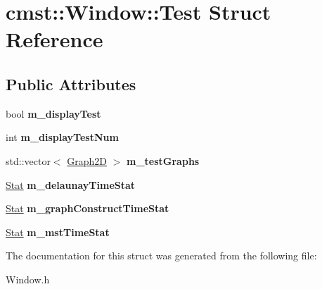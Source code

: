 \hypertarget{structcmst_1_1_window_1_1_test}{}\section{cmst\+:\+:Window\+:\+:Test Struct Reference}
\label{structcmst_1_1_window_1_1_test}
\subsection*{Public Attributes}
\begin{DoxyCompactItemize}
\item 
bool {\bfseries m\+\_\+display\+Test}\hypertarget{structcmst_1_1_window_1_1_test_a6e01140b018e7c479b15ae6499d8b9e8}{}\label{structcmst_1_1_window_1_1_test_a6e01140b018e7c479b15ae6499d8b9e8}

\item 
int {\bfseries m\+\_\+display\+Test\+Num}\hypertarget{structcmst_1_1_window_1_1_test_a0968826c727c33df28c160c4095e0b2f}{}\label{structcmst_1_1_window_1_1_test_a0968826c727c33df28c160c4095e0b2f}

\item 
std\+::vector$<$ \hyperlink{classcmst_1_1_graph2_d}{Graph2D} $>$ {\bfseries m\+\_\+test\+Graphs}\hypertarget{structcmst_1_1_window_1_1_test_a42f44814c524399a3c1f547a64218c1a}{}\label{structcmst_1_1_window_1_1_test_a42f44814c524399a3c1f547a64218c1a}

\item 
\hyperlink{classcmst_1_1_stat}{Stat} {\bfseries m\+\_\+delaunay\+Time\+Stat}\hypertarget{structcmst_1_1_window_1_1_test_a6f0ad01079d1c5b149282e31db771772}{}\label{structcmst_1_1_window_1_1_test_a6f0ad01079d1c5b149282e31db771772}

\item 
\hyperlink{classcmst_1_1_stat}{Stat} {\bfseries m\+\_\+graph\+Construct\+Time\+Stat}\hypertarget{structcmst_1_1_window_1_1_test_a4ff72191889ff43d7d80517120a97fae}{}\label{structcmst_1_1_window_1_1_test_a4ff72191889ff43d7d80517120a97fae}

\item 
\hyperlink{classcmst_1_1_stat}{Stat} {\bfseries m\+\_\+mst\+Time\+Stat}\hypertarget{structcmst_1_1_window_1_1_test_a103594f227a761c33c06b8dd68713c18}{}\label{structcmst_1_1_window_1_1_test_a103594f227a761c33c06b8dd68713c18}

\end{DoxyCompactItemize}


The documentation for this struct was generated from the following file\+:\begin{DoxyCompactItemize}
\item 
Window.\+h\end{DoxyCompactItemize}
